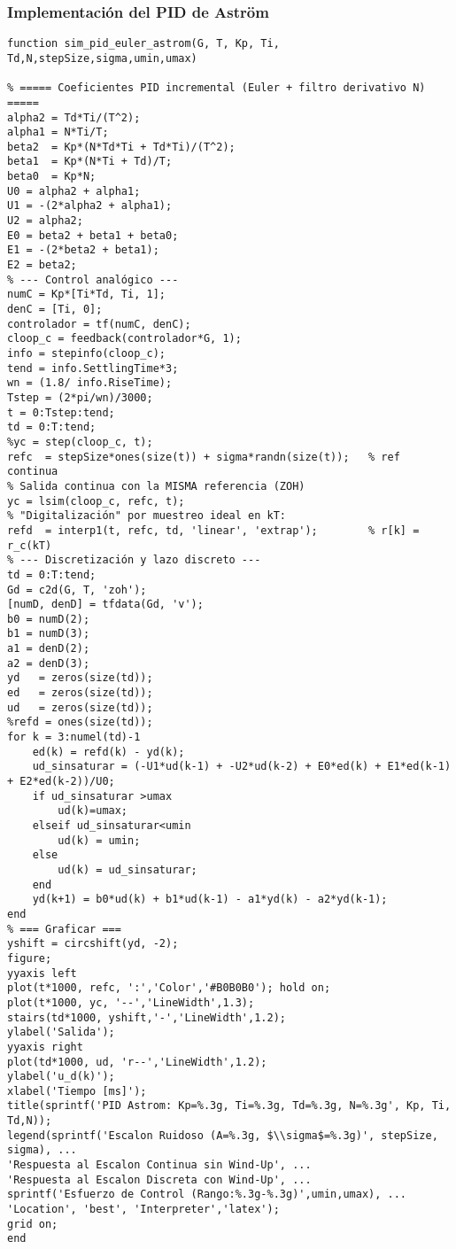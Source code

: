\subsubsection{Implementación del PID de Astr\"om}

\onecolumn
\begin{lstlisting}[style=matlabstyle,caption={Script en Matlab},label={lst:mat6}]
function sim_pid_euler_astrom(G, T, Kp, Ti, Td,N,stepSize,sigma,umin,umax)

% ===== Coeficientes PID incremental (Euler + filtro derivativo N) =====
alpha2 = Td*Ti/(T^2);
alpha1 = N*Ti/T;
beta2  = Kp*(N*Td*Ti + Td*Ti)/(T^2);
beta1  = Kp*(N*Ti + Td)/T;
beta0  = Kp*N;
U0 = alpha2 + alpha1;
U1 = -(2*alpha2 + alpha1);
U2 = alpha2;
E0 = beta2 + beta1 + beta0;
E1 = -(2*beta2 + beta1);
E2 = beta2;
% --- Control analógico ---
numC = Kp*[Ti*Td, Ti, 1];
denC = [Ti, 0];
controlador = tf(numC, denC);
cloop_c = feedback(controlador*G, 1);
info = stepinfo(cloop_c);
tend = info.SettlingTime*3;
wn = (1.8/ info.RiseTime);
Tstep = (2*pi/wn)/3000;
t = 0:Tstep:tend;
td = 0:T:tend;
%yc = step(cloop_c, t);
refc  = stepSize*ones(size(t)) + sigma*randn(size(t));   % ref continua
% Salida continua con la MISMA referencia (ZOH)
yc = lsim(cloop_c, refc, t);
% "Digitalización" por muestreo ideal en kT:
refd  = interp1(t, refc, td, 'linear', 'extrap');        % r[k] = r_c(kT)
% --- Discretización y lazo discreto ---
td = 0:T:tend;
Gd = c2d(G, T, 'zoh');
[numD, denD] = tfdata(Gd, 'v');
b0 = numD(2);
b1 = numD(3);
a1 = denD(2);
a2 = denD(3);
yd   = zeros(size(td));
ed   = zeros(size(td));
ud   = zeros(size(td));
%refd = ones(size(td));
for k = 3:numel(td)-1
	ed(k) = refd(k) - yd(k);
	ud_sinsaturar = (-U1*ud(k-1) + -U2*ud(k-2) + E0*ed(k) + E1*ed(k-1) + E2*ed(k-2))/U0;
	if ud_sinsaturar >umax
		ud(k)=umax;
	elseif ud_sinsaturar<umin
		ud(k) = umin;
	else
		ud(k) = ud_sinsaturar;
	end
	yd(k+1) = b0*ud(k) + b1*ud(k-1) - a1*yd(k) - a2*yd(k-1);
end
% === Graficar ===
yshift = circshift(yd, -2);
figure;
yyaxis left
plot(t*1000, refc, ':','Color','#B0B0B0'); hold on;
plot(t*1000, yc, '--','LineWidth',1.3);
stairs(td*1000, yshift,'-','LineWidth',1.2);
ylabel('Salida');
yyaxis right
plot(td*1000, ud, 'r--','LineWidth',1.2);
ylabel('u_d(k)');
xlabel('Tiempo [ms]');
title(sprintf('PID Astrom: Kp=%.3g, Ti=%.3g, Td=%.3g, N=%.3g', Kp, Ti, Td,N));
legend(sprintf('Escalon Ruidoso (A=%.3g, $\\sigma$=%.3g)', stepSize, sigma), ...
'Respuesta al Escalon Continua sin Wind-Up', ...
'Respuesta al Escalon Discreta con Wind-Up', ...
sprintf('Esfuerzo de Control (Rango:%.3g-%.3g)',umin,umax), ...
'Location', 'best', 'Interpreter','latex');
grid on;
end

	
\end{lstlisting}

\twocolumn